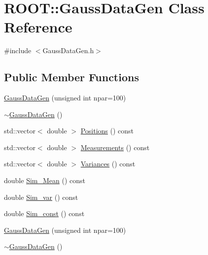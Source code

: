 \hypertarget{classROOT_1_1Minuit2_1_1GaussDataGen}{}\section{R\+O\+OT\+:\+:Gauss\+Data\+Gen Class Reference}
\label{classROOT_1_1Minuit2_1_1GaussDataGen}


{\ttfamily \#include $<$Gauss\+Data\+Gen.\+h$>$}

\subsection*{Public Member Functions}
\begin{DoxyCompactItemize}
\item 
\mbox{\hyperlink{classROOT_1_1Minuit2_1_1GaussDataGen_a9d4852a18f8d4f261ea60f5b2abeee4d}{Gauss\+Data\+Gen}} (unsigned int npar=100)
\item 
\mbox{\hyperlink{classROOT_1_1Minuit2_1_1GaussDataGen_ab35aa0205949603dbe8731c6d47e79f0}{$\sim$\+Gauss\+Data\+Gen}} ()
\item 
std\+::vector$<$ double $>$ \mbox{\hyperlink{classROOT_1_1Minuit2_1_1GaussDataGen_a1f8db2c19b438ac1665045a5737c1d62}{Positions}} () const
\item 
std\+::vector$<$ double $>$ \mbox{\hyperlink{classROOT_1_1Minuit2_1_1GaussDataGen_aa943fffb99444ab2b72198f36b906f71}{Measurements}} () const
\item 
std\+::vector$<$ double $>$ \mbox{\hyperlink{classROOT_1_1Minuit2_1_1GaussDataGen_ab2f22917ba4f242a2888c908a8629260}{Variances}} () const
\item 
double \mbox{\hyperlink{classROOT_1_1Minuit2_1_1GaussDataGen_a97c0d9f3e7d706d93a06f8bad82e137a}{Sim\+\_\+\+Mean}} () const
\item 
double \mbox{\hyperlink{classROOT_1_1Minuit2_1_1GaussDataGen_ab46d49eb0cd02fcf7e5799258133c91b}{Sim\+\_\+var}} () const
\item 
double \mbox{\hyperlink{classROOT_1_1Minuit2_1_1GaussDataGen_afa45bb0270f15866b588da8d8f56cfba}{Sim\+\_\+const}} () const
\item 
\mbox{\hyperlink{classROOT_1_1Minuit2_1_1GaussDataGen_a9d4852a18f8d4f261ea60f5b2abeee4d}{Gauss\+Data\+Gen}} (unsigned int npar=100)
\item 
\mbox{\hyperlink{classROOT_1_1Minuit2_1_1GaussDataGen_ab35aa0205949603dbe8731c6d47e79f0}{$\sim$\+Gauss\+Data\+Gen}} ()
\item 

\end{DoxyCompactItemize}
